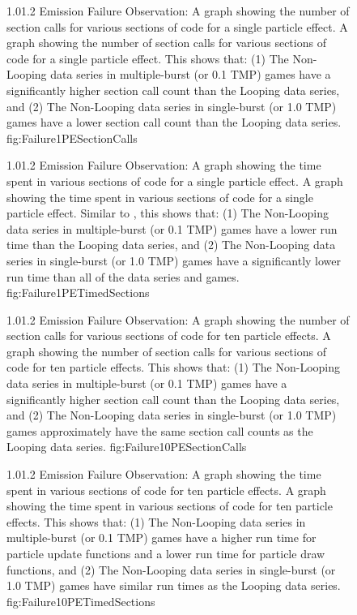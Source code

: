 \begin{figure}
\addtocounter{figure}{-1}

	\vspace{-1.5cm}
	{1.0}{1.2}
	{Emission Failure Observation: A graph showing the number of section calls for various sections of code for a single particle effect.}
	{A graph showing the number of section calls for various sections of code for a single particle effect. This shows that: (1) The Non-Looping data series in multiple-burst (or 0.1 TMP) games have a significantly higher section call count than the Looping data series, and (2) The Non-Looping data series in single-burst (or 1.0 TMP) games have a lower section call count than the Looping data series. }
	{fig:Failure1PESectionCalls}

	{1.0}{1.2}
	{Emission Failure Observation: A graph showing the time spent in various sections of code for a single particle effect.}
	{A graph showing the time spent in various sections of code for a single particle effect. Similar to , this shows that: (1) The Non-Looping data series in multiple-burst (or 0.1 TMP) games have a lower run time than the Looping data series, and (2) The Non-Looping data series in single-burst (or 1.0 TMP) games have a significantly lower run time than all of the data series and games. }
	{fig:Failure1PETimedSections}

\end{figure}

\begin{figure}
\addtocounter{figure}{-1}

	\vspace{-1.5cm}
	{1.0}{1.2}
	{Emission Failure Observation: A graph showing the number of section calls for various sections of code for ten particle effects.}
	{A graph showing the number of section calls for various sections of code for ten particle effects. This shows that: (1) The Non-Looping data series in multiple-burst (or 0.1 TMP) games have a significantly higher section call count than the Looping data series, and (2) The Non-Looping data series in single-burst (or 1.0 TMP) games approximately have the same section call counts as the Looping data series. }
	{fig:Failure10PESectionCalls}

	{1.0}{1.2}
	{Emission Failure Observation: A graph showing the time spent in various sections of code for ten particle effects.}
	{A graph showing the time spent in various sections of code for ten particle effects. This shows that: (1) The Non-Looping data series in multiple-burst (or 0.1 TMP) games have a higher run time for particle update functions and a lower run time for particle draw functions, and (2) The Non-Looping data series in single-burst (or 1.0 TMP) games have similar run times as the Looping data series.}
	{fig:Failure10PETimedSections}

\end{figure}

